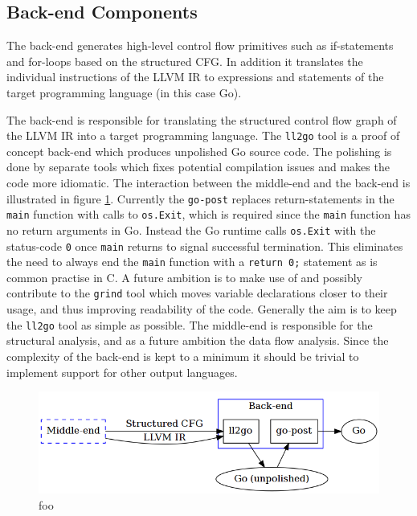 \subsection{Back-end Components}


The back-end generates high-level control flow primitives such as if-statements and for-loops based on the structured CFG. In addition it translates the individual instructions of the LLVM IR to expressions and statements of the target programming language (in this case Go).

The back-end is responsible for translating the structured control flow graph of the LLVM IR into a target programming language. The \texttt{ll2go} tool is a proof of concept back-end which produces unpolished Go source code. The polishing is done by separate tools which fixes potential compilation issues and makes the code more idiomatic. The interaction between the middle-end and the back-end is illustrated in figure \ref{fig:back-end}. Currently the \texttt{go-post} replaces return-statements in the \texttt{main} function with calls to \texttt{os.Exit}, which is required since the \texttt{main} function has no return arguments in Go. Instead the Go runtime calls \texttt{os.Exit} with the status-code \texttt{0} once \texttt{main} returns to signal successful termination. This eliminates the need to always end the \texttt{main} function with a \texttt{return 0;} statement as is common practise in C. A future ambition is to make use of and possibly contribute to the \texttt{grind} tool which moves variable declarations closer to their usage, and thus improving readability of the code. Generally the aim is to keep the \texttt{ll2go} tool as simple as possible. The middle-end is responsible for the structural analysis, and as a future ambition the data flow analysis. Since the complexity of the back-end is kept to a minimum it should be trivial to implement support for other output languages.

\begin{figure}[htbp]
	\begin{center}
		\includegraphics[width=\textwidth]{inc/back-end.png}
		\caption{foo}
		\label{fig:back-end}
	\end{center}
\end{figure}

